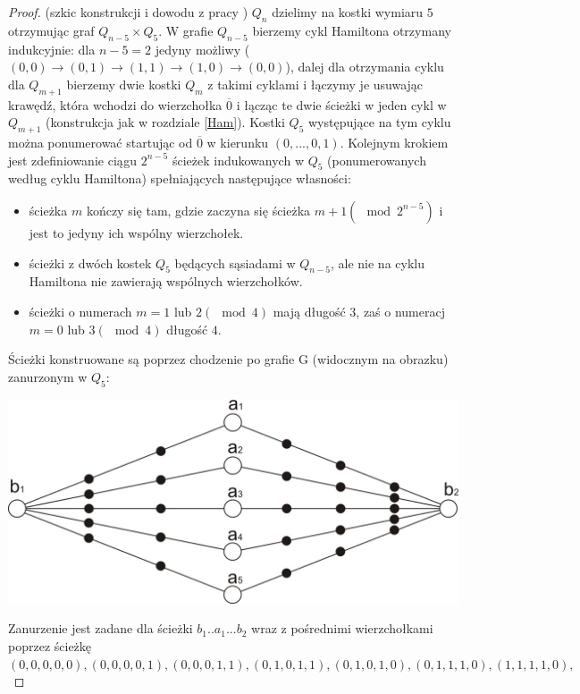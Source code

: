 \documentclass{pracamgr}
\begin{document}
     \begin{proof}(szkic konstrukcji i dowodu z pracy \cite{Snake2})
      $Q_n$ dzielimy na kostki wymiaru $5$ otrzymując graf $Q_{n-5}\times Q_5$. W grafie $Q_{n-5}$ bierzemy cykl Hamiltona otrzymany indukcyjnie:
      dla $n-5=2$ jedyny możliwy ($(0,0)\rightarrow(0,1)\rightarrow(1,1)\rightarrow(1,0)\rightarrow(0,0)$),
      dalej dla otrzymania cyklu dla $Q_{m+1}$ bierzemy dwie kostki $Q_m$ z takimi cyklami i łączymy je usuwając krawędź, która wchodzi do wierzchołka
      $\overline{0}$ i łącząc te dwie ścieżki w jeden cykl w $Q_{m+1}$ (konstrukcja jak w rozdziale \ref{Ham}).
      Kostki $Q_5$ występujące na tym cyklu można ponumerować startując od $\overline{0}$ w kierunku $(0,...,0,1)$.\newline
      Kolejnym krokiem jest zdefiniowanie ciągu $2^{n-5}$ ścieżek indukowanych w $Q_5$ (ponumerowanych według cyklu Hamiltona)
      spełniających następujące własności:
      \begin{itemize}
       \item ścieżka $m$ kończy się tam, gdzie zaczyna się ścieżka $m+1 (\mod 2^{n-5})$ i jest to jedyny ich wspólny wierzchołek.
       \item ścieżki z dwóch kostek $Q_5$ będących sąsiadami w $Q_{n-5}$, ale nie na cyklu Hamiltona nie zawierają wspólnych wierzchołków.
       \item ścieżki o numerach $m=1$ lub $2(\mod 4)$ mają długość $3$, zaś o numeracj $m=0$ lub $3(\mod 4)$ długość $4$.
      \end{itemize}
      Ścieżki konstruowane są poprzez chodzenie po grafie G (widocznym na obrazku) zanurzonym w $Q_5$:
      \begin{center}
       \includegraphics[scale=1]{img/snake_G.jpg}
      \end{center}
      Zanurzenie jest zadane dla ścieżki $b_1..a_1...b_2$ wraz z pośrednimi wierzchołkami poprzez ścieżkę
      $(0,0,0,0,0),(0,0,0,0,1),(0,0,0,1,1),(0,1,0,1,1),(0,1,0,1,0),(0,1,1,1,0),(1,1,1,1,0),$\newline

\end{proof}
\end{document}
